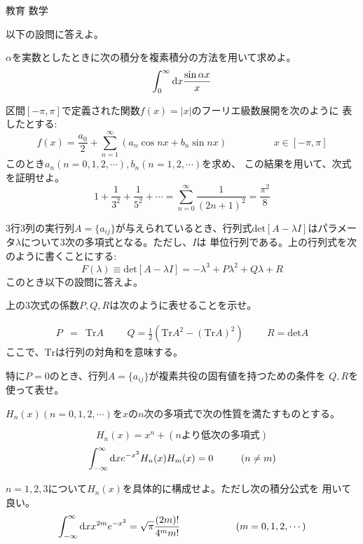 \documentclass[fleqn]{jbook}
\begin{document}
\begin{question}{教育 数学}{}

\begin{subquestions}
\SubQuestion
以下の設問に答えよ。
\begin{subsubquestions}
\SubSubQuestion
$\alpha$を実数としたときに次の積分を複素積分の方法を用いて求めよ。
\[ \int_{0}^{\infty} {\rm d}x \frac{\sin \alpha x}{x} \]

\SubSubQuestion
区間$[-\pi, \pi]$で定義された関数$f(x)=|x|$のフーリエ級数展開を次のように
表したとする:
\[ f(x) = \frac{a_0}{2} + \sum_{n=1}^{\infty} (a_n \cos nx + b_n \sin n x) 
\hspace{2cm} x \in [-\pi, \pi]\]
このとき$a_n (n=0,1,2,\cdots), b_n(n=1,2,\cdots)$を求め、
この結果を用いて、次式を証明せよ。
\[ 1 + \frac{1}{3^2} + \frac{1}{5^2} + \cdots = \sum_{n=0}^{\infty}
\frac{1}{(2n+1)^2} = \frac{\pi^2}{8}\]
\end{subsubquestions}

\SubQuestion
3行3列の実行列$A=\{ a_{ij} \}$が与えられているとき、行列式$\mbox{det} [ A-
\lambda I ]$はパラメータ$\lambda$について3次の多項式となる。ただし、$I$は
単位行列である。上の行列式を次のように書くことにする:
\[ F(\lambda) \equiv \mbox{det} [ A-\lambda I ] = -\lambda^3 + P \lambda ^2 
+ Q \lambda + R\]
このとき以下の設問に答えよ。

\begin{subsubquestions}
\SubSubQuestion
上の3次式の係数$P,Q,R$は次のように表せることを示せ。

\begin{eqnarray*}
P &=& \mbox{Tr} A \hspace{1cm}
Q = \frac{1}{2} \left( \mbox{Tr} A^2 - ( \mbox{Tr} A)^2 \right) \hspace{1cm}
R =\mbox{det} A
\end{eqnarray*}
ここで、$\mbox{Tr}$は行列の対角和を意味する。

\SubSubQuestion
特に$P=0$のとき、行列$A=\{ a_{ij} \}$が複素共役の固有値を持つための条件を
$Q,R$を使って表せ。

\end{subsubquestions}
\SubQuestion
$H_n(x)(n=0,1,2,\cdots)$を$x$の$n$次の多項式で次の性質を満たすものとする。

\[H_n(x)=x^n+(nより低次の多項式) \]
\[\int_{-\infty}^{\infty} {\rm d}x e^{-x^2} H_n (x) H_m (x) = 0 \hspace{1cm}
(n \neq m)\]
\begin{subsubquestions}

\SubSubQuestion
$n=1,2,3$について$H_n(x)$を具体的に構成せよ。ただし次の積分公式を
用いて良い。
\[ \int_{-\infty}^{\infty} {\rm d}x x^{2m} e^{-x^2} = \sqrt{\pi} \frac{(2m)!}{4^m
m!} \hspace{2cm} (m=0,1,2,\cdots)\]


\end{subsubquestions}
\end{subquestions}
\end{question}
\end{document}
